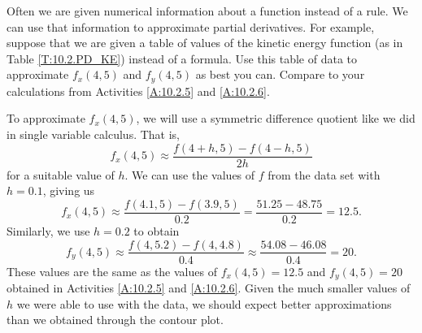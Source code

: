 \begin{activity} \label{A:10.2.8} Often we are given numerical information about a function instead of a rule. We can use that information to approximate partial derivatives. For example, suppose that we are given a table of values of the kinetic energy function (as in Table \ref{T:10.2.PD_KE}) instead of a formula. Use this table of data to approximate $f_x(4,5)$ and $f_y(4,5)$ as best you can. Compare to your calculations from Activities \ref{A:10.2.5} and \ref{A:10.2.6}.

\end{activity}
\begin{smallhint}

\end{smallhint}
\begin{bighint}

\end{bighint}
\begin{activitySolution}
To approximate $f_x(4,5)$, we will use a symmetric difference quotient like we did in single variable calculus. That is,
\[f_x(4,5) \approx \frac{f(4+h,5)-f(4-h,5)}{2h}\]
for a suitable value of $h$. We can use the values of $f$ from the data set with $h = 0.1$, giving us 
\[f_x(4,5) \approx  \frac{f(4.1,5)-f(3.9,5)}{0.2} = \frac{51.25-48.75}{0.2} = 12.5.\]
Similarly, we use $h = 0.2$ to obtain 
\[f_y(4,5) \approx  \frac{f(4,5.2)-f(4,4.8)}{0.4} \approx \frac{54.08-46.08}{0.4} = 20.\]
These values are the same as the values of $f_x(4,5) = 12.5$ and $f_y(4,5) = 20$ obtained in Activities \ref{A:10.2.5} and \ref{A:10.2.6}. Given the much smaller values of $h$ we were able to use with the data, we should expect better approximations than we obtained through the contour plot. 
\end{activitySolution}
\aftera
